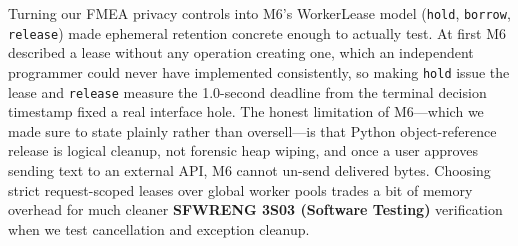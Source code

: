 \documentclass[12pt, titlepage]{article}
\newcommand{\ty}[1]{\textsf{#1}}
\begin{document}
Turning our FMEA privacy controls into M6's \ty{WorkerLease} model (\texttt{hold}, \texttt{borrow}, \texttt{release}) made ephemeral retention concrete enough to actually test. At first M6 described a lease without any operation creating one, which an independent programmer could never have implemented consistently, so making \texttt{hold} issue the lease and \texttt{release} measure the 1.0-second deadline from the terminal decision timestamp fixed a real interface hole. The honest limitation of M6---which we made sure to state plainly rather than oversell---is that Python object-reference release is logical cleanup, not forensic heap wiping, and once a user approves sending text to an external API, M6 cannot un-send delivered bytes. Choosing strict request-scoped leases over global worker pools trades a bit of memory overhead for much cleaner \textbf{SFWRENG 3S03 (Software Testing)} verification when we test cancellation and exception cleanup.
\end{document}
